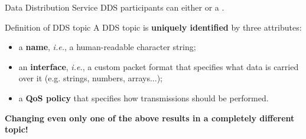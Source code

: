 \begin{frame}{Data Distribution Service}
	DDS participants can either  or  a .
	\begin{block}{Definition of DDS topic}
		A DDS topic is \textbf{uniquely identified} by three attributes:
		\begin{itemize}
			\item a \textbf{name}, \emph{i.e.}, a human-readable character string;
			\item an \textbf{interface}, \emph{i.e.}, a custom packet format that specifies what data is carried over it (e.g. strings, numbers, arrays...);
			\item a \textbf{QoS policy} that specifies how transmissions should be performed.
		\end{itemize}
	\end{block}
	\begin{block}{}
		\centering
		\textbf{Changing even only one of the above results in a completely different topic!}
	\end{block}
\end{frame}
